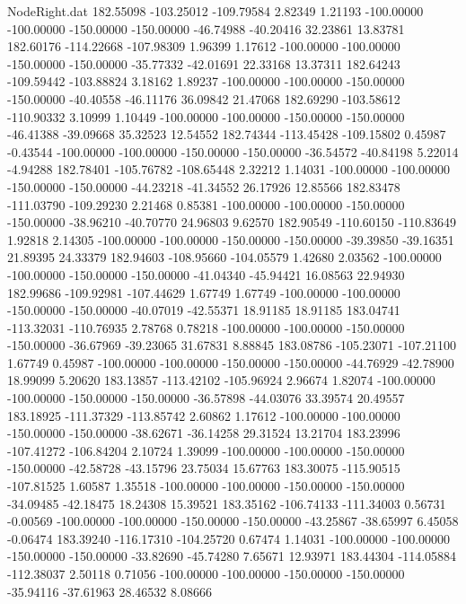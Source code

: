 \begin{filecontents}{NodeRight.dat}
 182.55098 -103.25012 -109.79584     2.82349    1.21193 -100.00000 -100.00000 -150.00000 -150.00000  -46.74988  -40.20416   32.23861   13.83781
 182.60176 -114.22668 -107.98309     1.96399    1.17612 -100.00000 -100.00000 -150.00000 -150.00000  -35.77332  -42.01691   22.33168   13.37311
 182.64243 -109.59442 -103.88824     3.18162    1.89237 -100.00000 -100.00000 -150.00000 -150.00000  -40.40558  -46.11176   36.09842   21.47068
 182.69290 -103.58612 -110.90332     3.10999    1.10449 -100.00000 -100.00000 -150.00000 -150.00000  -46.41388  -39.09668   35.32523   12.54552
 182.74344 -113.45428 -109.15802     0.45987   -0.43544 -100.00000 -100.00000 -150.00000 -150.00000  -36.54572  -40.84198    5.22014   -4.94288
 182.78401 -105.76782 -108.65448     2.32212    1.14031 -100.00000 -100.00000 -150.00000 -150.00000  -44.23218  -41.34552   26.17926   12.85566
 182.83478 -111.03790 -109.29230     2.21468    0.85381 -100.00000 -100.00000 -150.00000 -150.00000  -38.96210  -40.70770   24.96803    9.62570
 182.90549 -110.60150 -110.83649     1.92818    2.14305 -100.00000 -100.00000 -150.00000 -150.00000  -39.39850  -39.16351   21.89395   24.33379
 182.94603 -108.95660 -104.05579     1.42680    2.03562 -100.00000 -100.00000 -150.00000 -150.00000  -41.04340  -45.94421   16.08563   22.94930
 182.99686 -109.92981 -107.44629     1.67749    1.67749 -100.00000 -100.00000 -150.00000 -150.00000  -40.07019  -42.55371   18.91185   18.91185
 183.04741 -113.32031 -110.76935     2.78768    0.78218 -100.00000 -100.00000 -150.00000 -150.00000  -36.67969  -39.23065   31.67831    8.88845
 183.08786 -105.23071 -107.21100     1.67749    0.45987 -100.00000 -100.00000 -150.00000 -150.00000  -44.76929  -42.78900   18.99099    5.20620
 183.13857 -113.42102 -105.96924     2.96674    1.82074 -100.00000 -100.00000 -150.00000 -150.00000  -36.57898  -44.03076   33.39574   20.49557
 183.18925 -111.37329 -113.85742     2.60862    1.17612 -100.00000 -100.00000 -150.00000 -150.00000  -38.62671  -36.14258   29.31524   13.21704
 183.23996 -107.41272 -106.84204     2.10724    1.39099 -100.00000 -100.00000 -150.00000 -150.00000  -42.58728  -43.15796   23.75034   15.67763
 183.30075 -115.90515 -107.81525     1.60587    1.35518 -100.00000 -100.00000 -150.00000 -150.00000  -34.09485  -42.18475   18.24308   15.39521
 183.35162 -106.74133 -111.34003     0.56731   -0.00569 -100.00000 -100.00000 -150.00000 -150.00000  -43.25867  -38.65997    6.45058   -0.06474
 183.39240 -116.17310 -104.25720     0.67474    1.14031 -100.00000 -100.00000 -150.00000 -150.00000  -33.82690  -45.74280    7.65671   12.93971
 183.44304 -114.05884 -112.38037     2.50118    0.71056 -100.00000 -100.00000 -150.00000 -150.00000  -35.94116  -37.61963   28.46532    8.08666

\end{filecontents}
